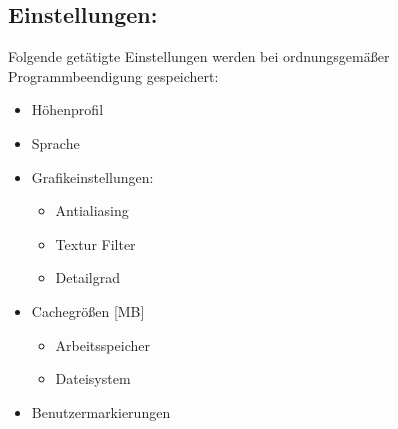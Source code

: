 \documentclass[10pt]{scrreprt}
\begin{document}
\vspace{3mm}
\subsection*{Einstellungen:}
Folgende getätigte Einstellungen werden bei ordnungsgemäßer Programmbeendigung gespeichert:
\begin{itemize}
\item Höhenprofil
\item Sprache
\item Grafikeinstellungen:
	\begin{itemize}
	\item Antialiasing
	\item Textur Filter
	\item Detailgrad
	\end{itemize}
\item Cachegrößen [MB]
	\begin{itemize}
	\item Arbeitsspeicher
	\item Dateisystem
	\end{itemize}
\item Benutzermarkierungen
\end{itemize}
\end{document}
